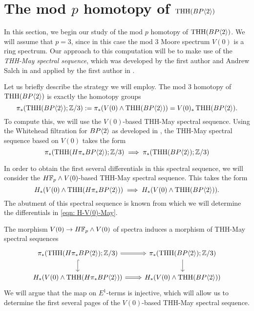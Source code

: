 
\section{The mod $p$ homotopy of $\operatorname{THH}(BP\langle 2 \rangle)$}

In this section, we begin our study of the mod $p$ homotopy of $\operatorname{THH}(BP\langle 2 \rangle)$. We will assume that $p=3$, since in this case the mod 3 Moore spectrum $V(0)$ is a ring spectrum. Our approach to this computation will be to make use of the \emph{THH-May spectral sequence}, which was developed by the first author and Andrew Salch in \cite{THH-May} and applied by the first author in \cite{THHK1-local}. 

Let us briefly describe the strategy we will employ. The mod 3 homotopy of $\operatorname{THH}(BP\langle 2 \rangle)$ is exactly the homotopy groups
\[
\pi_*(\operatorname{THH}(BP\langle 2 \rangle);\mathbb{Z}/3):= \pi_*(V(0)\wedge \operatorname{THH}(BP\langle 2 \rangle)) = V(0)_*\operatorname{THH}(BP\langle 2 \rangle).
\]
To compute this, we will use the $V(0)$-based THH-May spectral sequence. Using the Whitehead filtration for $BP\langle 2 \rangle$ as developed in \cite{THH-May}, the THH-May spectral sequence based on $V(0)$ takes the form 
\begin{equation}\label{eqn:V(0)-May}
	\pi_*(\operatorname{THH}(H\pi_*BP\langle 2 \rangle);\mathbb{Z}/3)\implies \pi_*(\operatorname{THH}(BP\langle 2 \rangle);\mathbb{Z}/3)
\end{equation}

In order to obtain the first several differentials in this spectral sequence, we will consider the $H\mathbb{F}_p\wedge V(0)$-based THH-May spectral sequence. This takes the form 
\begin{equation}\label{eqn: H-V(0)-May}
	H_*(V(0)\wedge \operatorname{THH}(H\pi_*BP\langle 2 \rangle))\implies H_*(V(0)\wedge \operatorname{THH}(BP\langle 2 \rangle)).
\end{equation}
The abutment of this spectral sequence is known from which we will determine the differentials in \eqref{eqn: H-V(0)-May}.

The morphism $V(0)\to H\mathbb{F}_p\wedge V(0)$ of spectra induces a morphism of THH-May spectral sequences
\begin{equation}\label{eqn:morphism of THH-MaySS}
\begin{tikzcd}
	\pi_*(\THH(H\pi_*\B);\Z/3)\arrow[d, hook]\arrow[r,Rightarrow]& \pi_*(\THH(\B);\Z/3)\arrow[d]\\
	 H_*(V(0)\wedge \THH(H\pi_*\B))\arrow[r, Rightarrow] & H_*(V(0)\wedge \THH(\B))
\end{tikzcd}
\end{equation}
We will argue that the map on $E^1$-terms is injective, which will allow us to determine the first several pages of the $V(0)$-based THH-May spectral sequence. 

